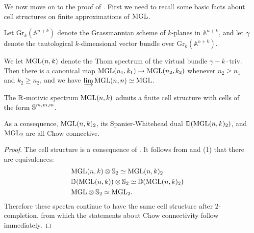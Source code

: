 We now move on to the proof of . First we need to recall some basic facts about cell structures on finite approximations of $\mathrm{MGL}$.

\begin{dfn}
  Let $\mathrm{Gr}_k (\mathbb{A}^{n+k})$ denote the Grassmannian scheme of $k$-planes in $\mathbb{A}^{n+k}$, and let $\gamma$ denote the tautological $k$-dimensional vector bundle over $\mathrm{Gr}_k (\mathbb{A}^{n+k})$.

  We let $\mathrm{MGL}(n,k)$ denote the Thom spectrum of the virtual bundle $\gamma - k\cdot \mathrm{triv}$. Then there is a canonical map $\mathrm{MGL} (n_1,k_1) \to \mathrm{MGL}(n_2, k_2)$ whenever $n_2 \geq n_1$ and $k_2 \geq n_2$, and we have $\varinjlim \mathrm{MGL}(n,n) \simeq \mathrm{MGL}$.
\end{dfn}

\begin{prop} \label{prop:MGL-chow-conn} \label{cor:MGL-dual-Chow-conn}
  The $\mathbb{R}$-motivic spectrum $\mathrm{MGL}(n,k)$ admits a finite cell structure with cells of the form $\operatorname{\mathbb{S}}^{m,m,m}$.

  As a consequence, $\mathrm{MGL}(n,k)_2$, its Spanier-Whitehead dual $\mathbb{D}(\mathrm{MGL}(n,k)_2)$, and $\mathrm{MGL}_2$ are all Chow connective.
\end{prop}

\begin{proof}
  The cell structure is a consequence of \cite{DICell}.
  It follows from  and (1) that there are equivalences:
  \begin{align*}
    &\mathrm{MGL}(n,k) \otimes \operatorname{\mathbb{S}}_2 \simeq \mathrm{MGL}(n,k)_2 \\
    &\mathbb{D} (\mathrm{MGL}(n,k)) \otimes \operatorname{\mathbb{S}}_2 \simeq \mathbb{D} (\mathrm{MGL}(n,k)_2) \\
    &\mathrm{MGL} \otimes \operatorname{\mathbb{S}}_2 \simeq \mathrm{MGL}_2.
  \end{align*}
  Therefore these spectra continue to have the same cell structure after $2$-completion, from which the statements about Chow connectivity follow immediately.
\end{proof}

%
%

